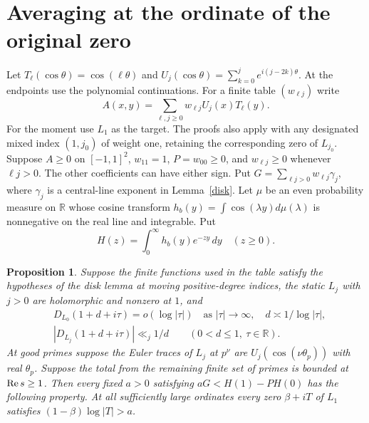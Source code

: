 \documentclass[11pt]{article}
\newtheorem{proposition}[theorem]{Proposition}\theoremstyle{definition}\newtheorem{definition}[theorem]{Definition}\newtheorem{remark}[theorem]{Remark}
\newcommand{\R}{\mathbb R}\newcommand{\Q}{\mathbb Q}\newcommand{\C}{\mathbb C}\newcommand{\Z}{\mathbb Z}
\begin{document}
\section{Averaging at the ordinate of the original zero}
Let $T_\ell(\cos\theta)=\cos(\ell\theta)$ and $U_j(\cos\theta)=\sum_{k=0}^j e^{i(j-2k)\theta}$. At the endpoints use the polynomial continuations. For a finite table $(w_{\ell j})$ write
\[
  A(x,y)=\sum_{\ell,j\ge0} w_{\ell j}U_j(x)T_\ell(y).
\]
For the moment use $L_1$ as the target. The proofs also apply with any designated mixed index $(1,j_0)$ of weight one, retaining the corresponding zero of $L_{j_0}$. Suppose $A\ge0$ on $[-1,1]^2$, $w_{11}=1$, $P=w_{00}\ge0$, and $w_{\ell j}\ge0$ whenever $\ell j>0$. The other coefficients can have either sign. Put $G=\sum_{\ell j>0}w_{\ell j}\gamma_j$, where $\gamma_j$ is a central-line exponent in Lemma~\ref{disk}. Let $\mu$ be an even probability measure on $\R$ whose cosine transform $h_b(y)=\int\cos(\lambda y)d\mu(\lambda)$ is nonnegative on the real line and integrable. Put
\[
 H(z)=\int_0^\infty h_b(y)e^{-zy}\,dy\quad(z\ge0).
\]
\begin{proposition}\label{average}
Suppose the finite functions used in the table satisfy the hypotheses of the disk lemma at moving positive-degree indices, the static $L_j$ with $j>0$ are holomorphic and nonzero at $1$, and
\[
\begin{split}
 &D_{L_0}(1+d+i\tau)=o(\log |\tau|)\quad
       \text{as }|\tau|\to\infty,\quad d\asymp1/\log|\tau|,\\
 &|D_{L_j}(1+d+i\tau)|\ll_j 1/d \qquad(0<d\le1,\ \tau\in\R).
\end{split}
\]
At good primes suppose the Euler traces of $L_j$ at $p^\nu$ are $U_j(\cos(\nu\theta_p))$ with real $\theta_p$. Suppose the total from the remaining finite set of primes is bounded at $\operatorname{Re} s\ge1$. Then every fixed $a>0$ satisfying $aG<H(1)-PH(0)$ has the following property. At all sufficiently large ordinates every zero $\beta+iT$ of $L_1$ satisfies $(1-\beta)\log|T|>a$.
\end{proposition}
\end{document}
